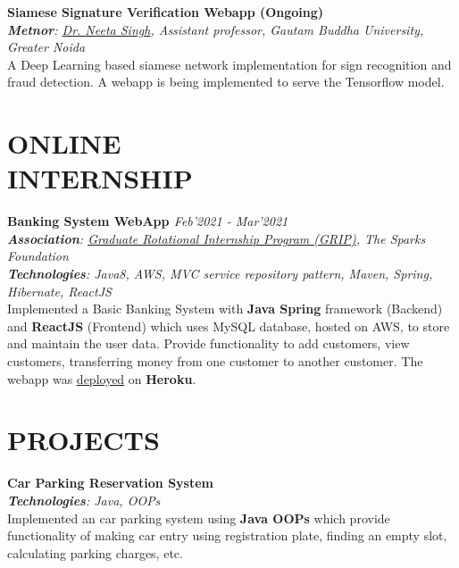 \documentclass[resmargin]{res}
\begin{document}
\begin{resume}
\textbf{Siamese Signature Verification Webapp (Ongoing)} {\sl  \hfill}
\\{\sl \textbf{Metnor}: \href{https://sites.google.com/view/neetasingh112}{Dr. Neeta Singh}, Assistant professor, Gautam Buddha University, Greater Noida}
\\ A Deep Learning  based siamese network implementation for sign recognition and fraud detection. A webapp is being implemented to serve the Tensorflow model.

\section{ONLINE\\ INTERNSHIP}

\textbf{Banking System WebApp
\href{https://www.youtube.com/watch?v=uO6ZealjeIA}{}
\href{https://bank-management-service-app.herokuapp.com/}{}
\href{https://github.com/malavp1998/bank-management-service}{\faGitSquare} \href{https://github.com/malavp1998/bank-management-web}{\faGitSquare}} {\sl  \hfill Feb'2021 - Mar'2021}
\\{\sl \textbf{Association}: \href{https://www.thesparksfoundationsingapore.org/join-us/internship-positions/}{Graduate Rotational Internship Program (GRIP)}, The Sparks Foundation}
\\{\sl \textbf{Technologies}: Java8, AWS, MVC service repository pattern, Maven, Spring, Hibernate, ReactJS}
\\Implemented a Basic Banking System with \textbf{Java Spring} framework (Backend) and \textbf{ReactJS} (Frontend) which uses MySQL database, hosted on AWS, to store and maintain the user data.
Provide functionality to add customers, view customers, transferring money from one customer to another customer. The webapp was \href{https://bank-management-service-app.herokuapp.com/}{deployed} on \textbf{Heroku}.

\section{PROJECTS}

\textbf{Car Parking Reservation System \href{https://github.com/malavp1998/parking-lot}{\faGitSquare}
}{\sl\hfill}
\\{\sl \textbf{Technologies}: Java, OOPs}
\\ Implemented an car parking system using \textbf{Java OOPs} which provide functionality of making car entry using registration plate, finding an empty slot, calculating parking charges, etc. 


\end{resume}
\end{document}
